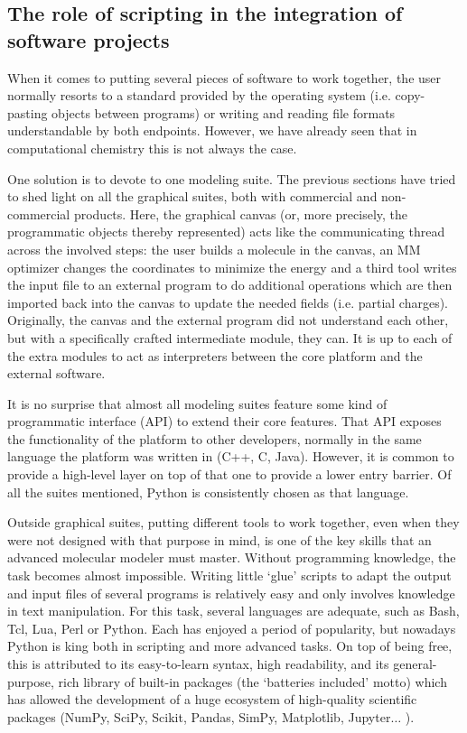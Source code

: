 

\subsection{The role of scripting in the integration of software projects}
When it comes to putting several pieces of software to work together, the user normally resorts to a standard provided by the operating system (i.e. copy-pasting objects between programs) or writing and reading file formats understandable by both endpoints. However, we have already seen that in computational chemistry this is not always the case.

One solution is to devote to one modeling suite. The previous sections have tried to shed light on all the graphical suites, both with commercial and non-commercial products. Here, the graphical canvas (or, more precisely, the programmatic objects thereby represented) acts like the communicating thread across the involved steps: the user builds a molecule in the canvas, an MM optimizer changes the coordinates to minimize the energy and a third tool writes the input file to an external program to do additional operations which are then imported back into the canvas to update the needed fields (i.e. partial charges). Originally, the canvas and the external program did not understand each other, but with a specifically crafted intermediate module, they can. It is up to each of the extra modules to act as interpreters between the core platform and the external software.

It is no surprise that almost all modeling suites feature some kind of programmatic interface (API) to extend their core features. That API exposes the functionality of the platform to other developers, normally in the same language the platform was written in (C++, C, Java). However, it is common to provide a high-level layer on top of that one to provide a lower entry barrier. Of all the suites mentioned, Python is consistently chosen as that language.

Outside graphical suites, putting different tools to work together, even when they were not designed with that purpose in mind, is one of the key skills that an advanced molecular modeler must master. Without programming knowledge, the task becomes almost impossible. Writing little ‘glue’ scripts to adapt the output and input files of several programs is relatively easy and only involves knowledge in text manipulation. For this task, several languages are adequate, such as Bash, Tcl, Lua, Perl or Python. Each has enjoyed a period of popularity, but nowadays Python is king both in scripting and more advanced tasks. On top of being free, this is attributed to its easy-to-learn syntax, high readability, and its general-purpose, rich library of built-in packages (the ‘batteries included’ motto) which has allowed the development of a huge ecosystem of high-quality scientific packages (NumPy, SciPy, Scikit, Pandas, SimPy, Matplotlib, Jupyter$ \ldots $ ).

